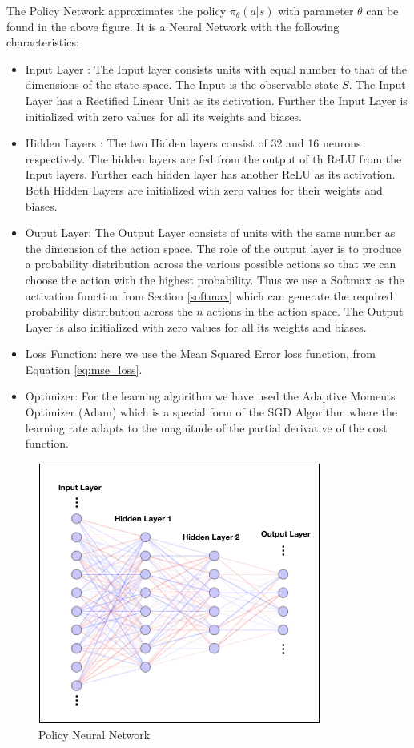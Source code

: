 \documentclass[14pt]{extarticle}
\numberwithin{equation}{section}
\begin{document}
	The Policy Network approximates the policy $\pi_{\theta}(a| s)$ with parameter $\theta$ can be found in the above figure. It is a Neural Network with the following characteristics:
	\begin{itemize}
		\item Input Layer : The Input layer consists units with equal number to that of the dimensions of the state space. The Input is the observable state $S$. The Input Layer has a Rectified Linear Unit as its activation. Further the Input Layer is initialized with zero values for all its weights and biases. 
		\item Hidden Layers : The two Hidden layers consist of 32 and 16 neurons respectively. The hidden layers are fed from the output of th ReLU from the Input layers. Further each hidden layer has another ReLU as its activation. Both Hidden Layers are initialized with zero values for their weights and biases.
		\item Ouput Layer: The Output Layer consists of units with the same number as the dimension of the action space. The role of the output layer is to produce a probability distribution across the various possible actions so that we can choose the action with the highest probability. Thus we use a Softmax as the activation function from Section \ref{softmax} which can generate the required probability distribution across the $n$ actions in the action space. The Output Layer is also initialized with zero values for all its weights and biases.
		\item Loss Function: here we use the Mean Squared Error loss function, from Equation \eqref{eq:mse_loss}.
		\item Optimizer: For the learning algorithm we have used the Adaptive Moments Optimizer (Adam)\cite{kingma2014adam} which is a special form of the SGD Algorithm where the learning rate adapts to the magnitude of the partial derivative of the cost function. 
	\end{itemize}
	\begin{figure}[h]
		\vspace{0.2cm}
		\centering
		\includegraphics[scale=0.6]{nn-actor}
		\caption{Policy Neural Network
			\label{nn-policy}}
	\end{figure}
\end{document}
